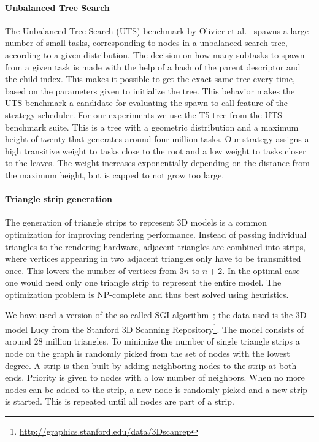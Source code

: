 \documentclass[a4paper,11pt]{article}
\begin{document}
\paragraph{Unbalanced Tree Search}
\label{sec:uts}

The Unbalanced Tree Search (UTS) benchmark by Olivier et
al.~\cite{olivier2007} spawns a large number of small tasks,
corresponding to nodes in a unbalanced search tree, according to a
given distribution.  The decision on how many subtasks to spawn from a
given task is made with the help of a hash of the parent descriptor
and the child index. This makes it possible to get the exact same tree
every time, based on the parameters given to initialize the tree.
This behavior makes the UTS benchmark a candidate for evaluating the
spawn-to-call feature of the strategy scheduler. For our experiments
we use the T5 tree from the UTS benchmark suite. This is a tree with a
geometric distribution and a maximum height of twenty that generates
around four million tasks. Our strategy assigns a high transitive
weight to tasks close to the root and a low weight to tasks closer to
the leaves.  The weight increases exponentially depending on the
distance from the maximum height, but is capped to not grow too large.

\paragraph{Triangle strip generation}



The generation of triangle strips to represent 3D models is a common
optimization for improving rendering performance. Instead of passing
individual triangles to the rendering hardware, adjacent triangles are
combined into strips, where vertices appearing in two adjacent
triangles only have to be transmitted once. This lowers the number of
vertices from $3n$ to $n+2$.  In the optimal case one would need only
one triangle strip to represent the entire model. The optimization problem
is NP-complete and thus best solved using heuristics.

We have used a version of the so called SGI algorithm~\cite{evans96};
the data used is the 3D model Lucy from the Stanford 3D Scanning
Repository\footnote{\url{http://graphics.stanford.edu/data/3Dscanrep}}.
The model consists of around 28 million triangles.  To minimize the
number of single triangle strips a node on the graph is randomly
picked from the set of nodes with the lowest degree.  A strip is then
built by adding neighboring nodes to the strip at both ends. Priority
is given to nodes with a low number of neighbors. When no more nodes
can be added to the strip, a new node is randomly picked and a new
strip is started. This is repeated until all nodes are part of a
strip.
\end{document}
